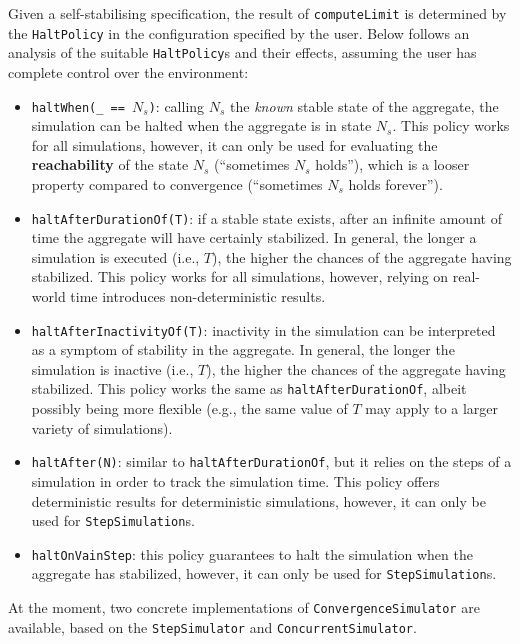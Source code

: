 Given a self-stabilising specification, the result of \texttt{computeLimit} is
determined by the \texttt{HaltPolicy} in the configuration specified by the
user. Below follows an analysis of the suitable \texttt{HaltPolicy}s and their
effects, assuming the user has complete control over the environment:
\begin{itemize}
  \item \texttt{haltWhen(\_ == $N_s$)}: calling $N_s$ the \textit{known} stable
        state of the aggregate, the simulation can be halted when the aggregate
        is in state $N_s$. This policy works for all simulations, however, it
        can only be used for evaluating the \textbf{reachability} of the state
        $N_s$ (\enquote{sometimes $N_s$ holds}), which is a looser property
        compared to convergence (\enquote{sometimes $N_s$ holds forever}).
  \item \texttt{haltAfterDurationOf(T)}: if a stable state exists, after an
        infinite amount of time the aggregate will have certainly stabilized.
        In general, the longer a simulation is executed (i.e., $T$), the
        higher the chances of the aggregate having stabilized. This policy
        works for all simulations, however, relying on real-world time
        introduces non-deterministic results.
  \item \texttt{haltAfterInactivityOf(T)}: inactivity in the simulation can be
        interpreted as a symptom of stability in the aggregate. In general,
        the longer the simulation is inactive (i.e., $T$), the higher the
        chances of the aggregate having stabilized. This policy works the same
        as \texttt{haltAfterDurationOf}, albeit possibly being more flexible
        (e.g., the same value of $T$ may apply to a larger variety of
        simulations).
  \item \texttt{haltAfter(N)}: similar to \texttt{haltAfterDurationOf}, but it
        relies on the steps of a simulation in order to track the simulation
        time. This policy offers deterministic results for deterministic
        simulations, however, it can only be used for \texttt{StepSimulation}s.
  \item \texttt{haltOnVainStep}: this policy guarantees to halt the simulation
        when the aggregate has stabilized, however, it can only be used for
        \texttt{StepSimulation}s.
\end{itemize}

At the moment, two concrete implementations of \texttt{ConvergenceSimulator}
are available, based on the \texttt{StepSimulator} and
\texttt{ConcurrentSimulator}.

